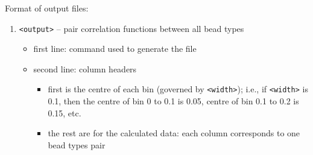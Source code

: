 \noindent
Format of output files:
\begin{enumerate}[nosep,leftmargin=20pt]
  \item \texttt{<output>} -- pair correlation functions between all bead types
    \begin{itemize}[nosep,leftmargin=5pt]
      \item first line: command used to generate the file
      \item second line: column headers
        \begin{itemize}[nosep,leftmargin=5pt]
          \item first is the centre of each bin (governed by
            \texttt{<width>}); i.e., if \texttt{<width>} is 0.1,
            then the centre of bin 0 to 0.1 is 0.05, centre of bin 0.1 to
            0.2 is 0.15, etc.
          \item the rest are for the calculated data: each column
            corresponds to one bead types pair
        \end{itemize}
    \end{itemize}
\end{enumerate}
